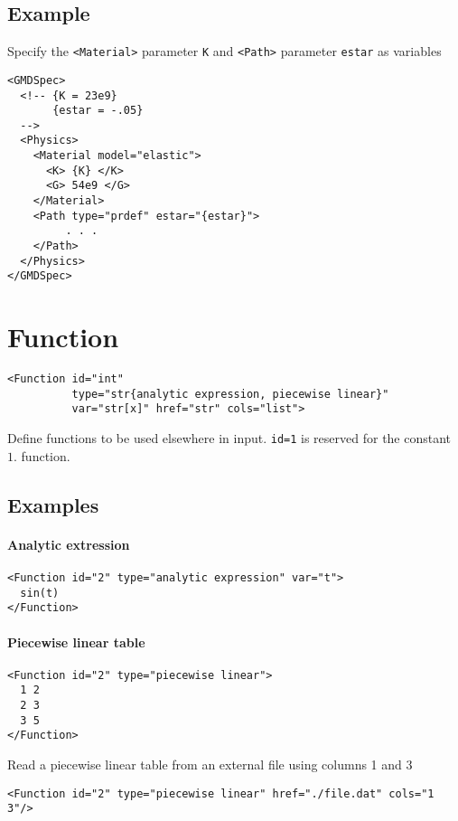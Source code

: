 \documentclass[11pt]{report}
\newcommand{\tag}[1]{\texttt{<#1>}}
\begin{document}
\subsection{Example}
Specify the \tag{Material} parameter \texttt{K} and \tag{Path} parameter
\texttt{estar} as variables
\begin{verbatim}
<GMDSpec>
  <!-- {K = 23e9}
       {estar = -.05}
  -->
  <Physics>
    <Material model="elastic">
      <K> {K} </K>
      <G> 54e9 </G>
    </Material>
    <Path type="prdef" estar="{estar}">
         . . .
    </Path>
  </Physics>
</GMDSpec>
\end{verbatim}

\section{Function}
\begin{verbatim}
<Function id="int"
          type="str{analytic expression, piecewise linear}"
          var="str[x]" href="str" cols="list">
\end{verbatim}
%
Define functions to be used elsewhere in input. \texttt{id=1} is
reserved for the constant $1.$ function.

\subsection{Examples}
\paragraph{Analytic extression}
%
\begin{verbatim}
<Function id="2" type="analytic expression" var="t">
  sin(t)
</Function>
\end{verbatim}

\paragraph{Piecewise linear table}
%
\begin{verbatim}
<Function id="2" type="piecewise linear">
  1 2
  2 3
  3 5
</Function>
\end{verbatim}
%
Read a piecewise linear table from an external file using columns 1 and 3
%
\begin{verbatim}
<Function id="2" type="piecewise linear" href="./file.dat" cols="1 3"/>
\end{verbatim}
\end{document}
